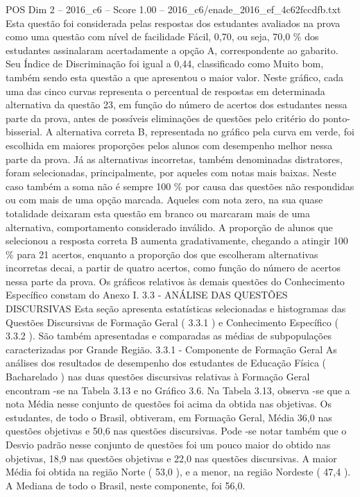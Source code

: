 \begin{textsample}{POS Dim 2 – 2016\_c6 – Score 1.00 – 2016\_c6/enade\_2016\_ef\_4c62fccdfb.txt}
Esta questão foi considerada pelas respostas dos estudantes avaliados na prova como uma questão com nível de facilidade Fácil, 0,70, ou seja, 70,0 \% dos estudantes assinalaram acertadamente a opção A, correspondente ao gabarito.
Seu Índice de Discriminação foi igual a 0,44, classificado como Muito bom, também sendo esta questão a que apresentou o maior valor.
Neste gráfico, cada uma das cinco curvas representa o percentual de respostas em determinada alternativa da questão 23, em função do número de acertos dos estudantes nessa parte da prova, antes de possíveis eliminações de questões pelo critério do ponto-bisserial.
A alternativa correta B, representada no gráfico pela curva em verde, foi escolhida em maiores proporções pelos alunos com desempenho melhor nessa parte da prova.
Já as alternativas incorretas, também denominadas distratores, foram selecionadas, principalmente, por aqueles com notas mais baixas.
Neste caso também a soma não é sempre 100 \% por causa das questões não respondidas ou com mais de uma opção marcada.
Aqueles com nota zero, na sua quase totalidade deixaram esta questão em branco ou marcaram mais de uma alternativa, comportamento considerado inválido.
A proporção de alunos que selecionou a resposta correta B aumenta gradativamente, chegando a atingir 100 \% para 21 acertos, enquanto a proporção dos que escolheram alternativas incorretas decai, a partir de quatro acertos, como função do número de acertos nessa parte da prova.
Os gráficos relativos às demais questões do Conhecimento Específico constam do Anexo I. 3.3 - ANÁLISE DAS QUESTÕES DISCURSIVAS Esta seção apresenta estatísticas selecionadas e histogramas das Questões Discursivas de Formação Geral ( 3.3.1 ) e Conhecimento Específico ( 3.3.2 ).
São também apresentadas e comparadas as médias de subpopulações caracterizadas por Grande Região. 3.3.1 - Componente de Formação Geral As análises dos resultados de desempenho dos estudantes de Educação Física ( Bacharelado ) nas duas questões discursivas relativas à Formação Geral encontram -se na Tabela 3.13 e no Gráfico 3.6.
Na Tabela 3.13, observa -se que a nota Média nesse conjunto de questões foi acima da obtida nas objetivas.
Os estudantes, de todo o Brasil, obtiveram, em Formação Geral, Média 36,0 nas questões objetivas e 50,6 nas questões discursivas.
Pode -se notar também que o Desvio padrão nesse conjunto de questões foi um pouco maior do obtido nas objetivas, 18,9 nas questões objetivas e 22,0 nas questões discursivas.
A maior Média foi obtida na região Norte ( 53,0 ), e a menor, na região Nordeste ( 47,4 ).
A Mediana de todo o Brasil, neste componente, foi 56,0.

\end{textsample}
